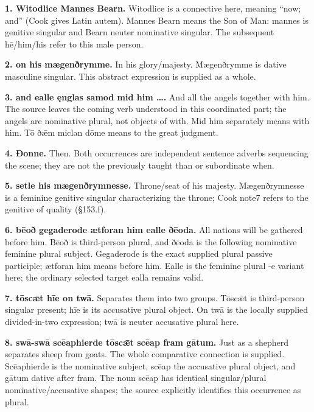 \textbf{1. Witodlice Mannes Bearn.} Witodlice is a connective here, meaning “now; and” (Cook gives Latin autem). Mannes Bearn means the Son of Man: mannes is genitive singular and Bearn neuter nominative singular. The subsequent hē/\allowbreak{}him/\allowbreak{}his refer to this male person.

\textbf{2. on his mægenðrymme.} In his glory/\allowbreak{}majesty. Mægenðrymme is dative masculine singular. This abstract expression is supplied as a whole.

\textbf{3. and ealle ęnglas samod mid him ….} And all the angels together with him. The source leaves the coming verb understood in this coordinated part; the angels are nominative plural, not objects of with. Mid him separately means with him. Tō ðǣm miclan dōme means to the great judgment.

\textbf{4. Ðonne.} Then. Both occurrences are independent sentence adverbs sequencing the scene; they are not the previously taught than or subordinate when.

\textbf{5. setle his mægenðrymnesse.} Throne/\allowbreak{}seat of his majesty. Mægenðrymnesse is a feminine genitive singular characterizing the throne; Cook note7 refers to the genitive of quality (§153.f).

\textbf{6. bēoð gegaderode ætforan him ealle ðēoda.} All nations will be gathered before him. Bēoð is third-person plural, and ðēoda is the following nominative feminine plural subject. Gegaderode is the exact supplied plural passive participle; ætforan him means before him. Ealle is the feminine plural -e variant here; the ordinary selected target ealla remains valid.

\textbf{7. tōscǣt hīe on twā.} Separates them into two groups. Tōscǣt is third-person singular present; hīe is its accusative plural object. On twā is the locally supplied divided-in-two expression; twā is neuter accusative plural here.

\textbf{8. swā-swā scēaphierde tōscǣt scēap fram gātum.} Just as a shepherd separates sheep from goats. The whole comparative connection is supplied. Scēaphierde is the nominative subject, scēap the accusative plural object, and gātum dative after fram. The noun scēap has identical singular/\allowbreak{}plural nominative/\allowbreak{}accusative shapes; the source explicitly identifies this occurrence as plural.

